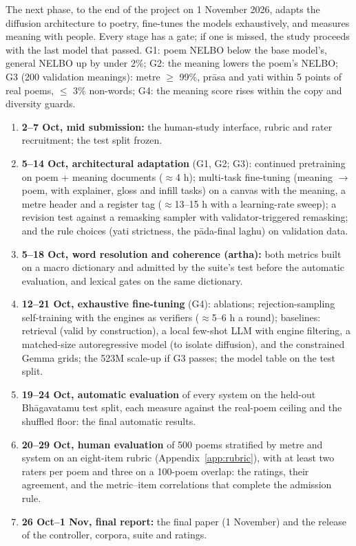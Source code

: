 \documentclass[11pt]{article}
\begin{document}
The next phase, to the end of the project on 1 November 2026, adapts the diffusion architecture to poetry,
fine-tunes the models exhaustively, and measures meaning with people. Every stage has a gate; if one is
missed, the study proceeds with the last model that passed. G1: poem NELBO below the base model's, general
NELBO up by under 2\%; G2: the meaning lowers the poem's NELBO; G3 (200 validation meanings): metre $\geq$
99\%, prāsa and yati within 5 points of real poems, $\leq$ 3\% non-words; G4: the meaning score rises within
the copy and diversity guards.
\begin{enumerate}
\item \textbf{2--7 Oct, mid submission:} the human-study interface, rubric and rater recruitment; the test
  split frozen.
\item \textbf{5--14 Oct, architectural adaptation} (G1, G2; G3): continued pretraining on poem + meaning
  documents ($\approx$4 h); multi-task fine-tuning (meaning $\rightarrow$ poem, with explainer, gloss and
  infill tasks) on a canvas with the meaning, a metre header and a register tag ($\approx$13--15 h with a
  learning-rate sweep); a revision test against a remasking sampler \citep{wang2025remdm} with
  validator-triggered remasking; and the rule choices (yati strictness, the pāda-final laghu) on
  validation data.
\item \textbf{5--18 Oct, word resolution and coherence (artha):} both metrics built on a macro dictionary
  and admitted by the suite's test before the automatic evaluation, and lexical gates on the same
  dictionary.
\item \textbf{12--21 Oct, exhaustive fine-tuning} (G4): ablations; rejection-sampling self-training with
  the engines as verifiers ($\approx$5--6 h a round); baselines: retrieval (valid by construction), a local
  few-shot LLM with engine filtering, a matched-size autoregressive model (to isolate diffusion), and the
  constrained Gemma grids; the 523M scale-up if G3 passes; the model table on the test split.
\item \textbf{19--24 Oct, automatic evaluation} of every system on the held-out Bhāgavatamu test split,
  each measure against the real-poem ceiling and the shuffled floor: the final automatic results.
\item \textbf{20--29 Oct, human evaluation} of 500 poems stratified by metre and system on an eight-item
  rubric (Appendix~\ref{app:rubric}), with at least two raters per poem and three on a 100-poem overlap:
  the ratings, their agreement, and the metric--item correlations that complete the admission rule.
\item \textbf{26 Oct--1 Nov, final report:} the final paper (1 November) and the release of the
  controller, corpora, suite and ratings.
\end{enumerate}
\end{document}
